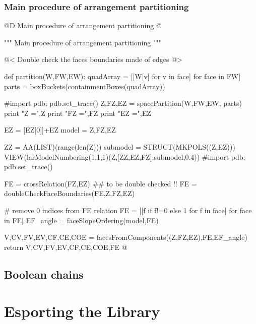 \documentclass[11pt,oneside]{article}    %
\begin{document}
\subsubsection{Main procedure of arrangement partitioning}

@D Main procedure of arrangement partitioning
@{""" Main procedure of arrangement partitioning """

@< Double check the faces boundaries made of edges @>

def partition(W,FW,EW):
    quadArray = [[W[v] for v in face] for face in FW]
    parts = boxBuckets(containmentBoxes(quadArray))

    #import pdb; pdb.set_trace()
    Z,FZ,EZ = spacePartition(W,FW,EW, parts)
    print "Z =",Z
    print "FZ =",FZ
    print "EZ =",EZ
    
    EZ = [EZ[0]]+EZ
    model = Z,FZ,EZ

    ZZ = AA(LIST)(range(len(Z)))
    submodel = STRUCT(MKPOLS((Z,EZ)))
    VIEW(larModelNumbering(1,1,1)(Z,[ZZ,EZ,FZ],submodel,0.4)) 
    #import pdb; pdb.set_trace()

    FE = crossRelation(FZ,EZ) ## to be double checked !!
    FE = doubleCheckFaceBoundaries(FE,Z,FZ,EZ)
    
    # remove 0 indices from FE relation
    FE = [[f if f!=0 else 1 for f in face] for face in FE]
    EF_angle = faceSlopeOrdering(model,FE)
    
    V,CV,FV,EV,CF,CE,COE = facesFromComponents((Z,FZ,EZ),FE,EF_angle)
    return V,CV,FV,EV,CF,CE,COE,FE
@}



\subsection{Boolean chains}

\section{Esporting the Library}
\end{document}
